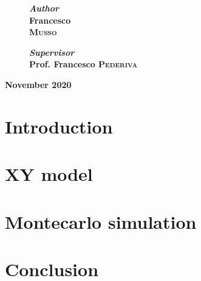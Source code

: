 \documentclass[12pt,twoside,openany]{report}
\begin{document}
\begin{titlepage}
\vfill

\begin{figure}[h]
\centering
\begin{minipage}{0.4\textwidth}
			    
\Large
\textbf{\textit{Author}\\
	Francesco\\ \textsc{Musso}} %

\end{minipage}
\qquad \qquad \qquad
\begin{minipage}{0.4\textwidth}

\begin{flushright}
\Large
\textbf{\textit{Supervisor}\\
	Prof. Francesco \textsc{Pederiva}} %
\end{flushright}

\end{minipage}
\end{figure}

\vfill
\textbf{{\Large November 2020}}

\end{titlepage}

\tableofcontents

\chapter{Introduction}



\chapter{XY model}



\chapter{Montecarlo simulation}



\chapter{Conclusion}


\printbibliography[heading=bibintoc]
\end{document}
